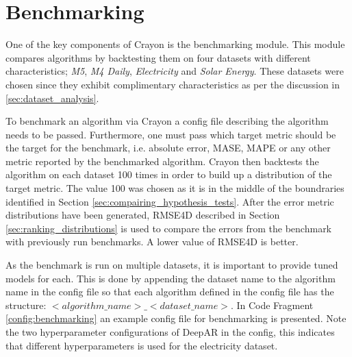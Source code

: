 \section{Benchmarking}
\label{subsec:benchmarking}
One of the key components of Crayon is the benchmarking module. This module compares algorithms by backtesting them on four datasets with different characteristics; \textit{M5}, \textit{M4 Daily}, \textit{Electricity} and \textit{Solar Energy}. These datasets were chosen since they exhibit complimentary characteristics as per the discussion in \ref{sec:dataset_analysis}.

To benchmark an algorithm via Crayon a config file describing the algorithm needs to be passed. Furthermore, one must pass which target metric should be the target for the benchmark, i.e. absolute error, MASE, MAPE or any other metric reported by the benchmarked algorithm. Crayon then backtests the algorithm on each dataset 100 times in order to build up a distribution of the target metric. The value 100 was chosen as it is in the middle of the boundraries identified in Section \ref{sec:compairing_hypothesis_tests}. After the error metric distributions have been generated, RMSE4D described in Section \ref{sec:ranking_distributions} is used to compare the errors from the benchmark with previously run benchmarks. A lower value of RMSE4D is better.

As the benchmark is run on multiple datasets, it is important to provide tuned models for each. This is done by appending the dataset name to the algorithm name in the config file so that each algorithm defined in the config file has the structure: \(<algorithm\_name>\_<dataset\_name>\). In Code Fragment \ref{config:benchmarking} an example config file for benchmarking is presented. Note the two hyperparameter configurations of DeepAR in the config, this indicates that different hyperparameters is used for the electricity dataset.

